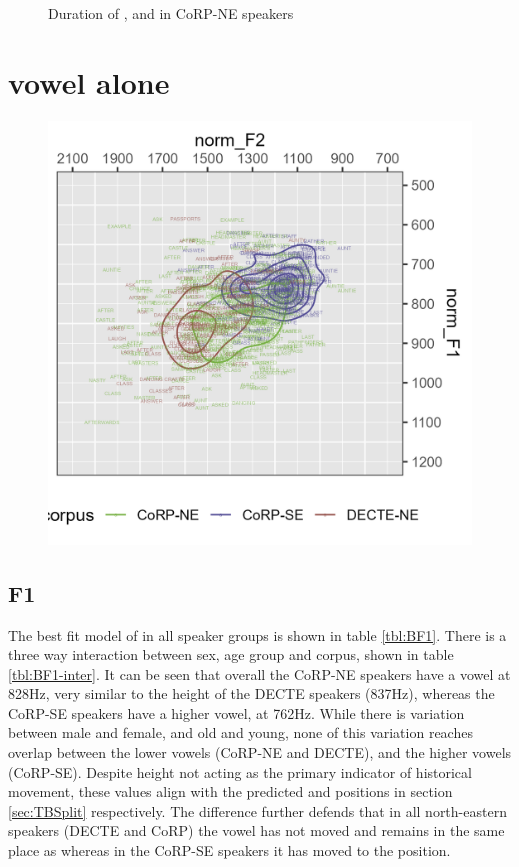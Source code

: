 \documentclass[../../../00.FullDoc/tex/APRReport-year4]{subfiles}
\begin{document}
\begin{figure}[h]
	
	\caption{Duration of \trap{}, \bath{} and \palm{} in CoRP-NE speakers} \label{fig:TBdurNE}
\end{figure}



\section{ vowel alone} \label{sec:bath4}

\begin{figure}[h]
	\includegraphics[width=\textwidth]{../figures/B-vplot.png}
	\caption{\bath{}} \label{fig:Bvplot}
\end{figure}



\subsection{F1}
The best fit model of \bath{} in all speaker groups is shown in table \ref{tbl:BF1}. There is a three way interaction between sex, age group and corpus, shown in table \ref{tbl:BF1-inter}. It can be seen that overall the CoRP-NE speakers have a \bath{} vowel at 828Hz, very similar to the height of the DECTE speakers (837Hz), whereas the CoRP-SE speakers have a higher vowel, at 762Hz. While there is variation between male and female, and old and young, none of this variation reaches overlap between the lower vowels (CoRP-NE and DECTE), and the higher vowels (CoRP-SE). Despite height not acting as the primary indicator of historical \bath{} movement, these values align with the predicted \trap{} and \palm{} positions in section \ref{sec:TBSplit} respectively. The difference further defends that in all north-eastern speakers (DECTE and CoRP) the \bath{} vowel has not moved and remains in the same place as \trap{} whereas in the CoRP-SE speakers it has moved to the \palm{} position.
\end{document}
